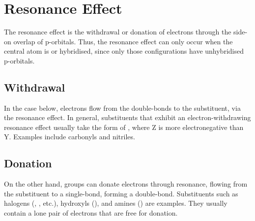 	\section{Resonance Effect}

		The resonance effect is the withdrawal or donation of electrons through the side-on overlap of  p-orbitals.
		Thus, the resonance effect can only occur when the central atom is \spone or \sptwo hybridised, since only those
		configurations have unhybridised p-orbitals.


		\subsection{Withdrawal}

			In the case below, electrons flow from the double-bonds to the substituent, via the resonance effect. In general, substituents
			that exhibit an electron-withdrawing resonance effect usually take the form of , where Z is more electronegative than Y.
			Examples include carbonyls and nitriles.




		\pagebreak
		\subsection{Donation}

			On the other hand, groups can donate electrons through resonance, flowing from the substituent to a single-bond, forming
			a double-bond. Substituents such as halogens (, \ch{\Cl}, etc.), hydroxyls (), and amines ()
			are examples. They usually contain a lone pair of electrons that are free for donation.


